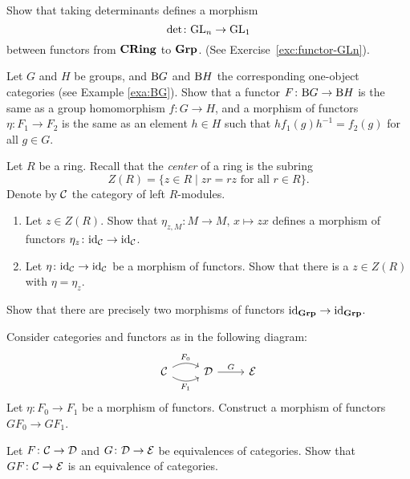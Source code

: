 \begin{exercise}
Show that taking determinants defines a morphism 
\[
	\det\colon\!\operatorname{GL}_n \to \operatorname{GL}_1
\]
between functors from $\mathbf{CRing}$ to $\mathbf{Grp}$. (See Exercise~\ref{exc:functor-GLn}).
\end{exercise}


\begin{exercise}
Let $G$ and $H$ be groups, and ${\mathrm B} G$ and ${\mathrm B} H$ the corresponding one-object categories (see Example \ref{exa:BG}). Show that a functor $F\colon {\mathrm B} G \to {\mathrm B} H$ is the same as a group homomorphism $f\colon G\to H$, and a morphism of functors $\eta\colon F_1 \to F_2$ is the same as an element $h\in H$ such that $h f_1(g) h^{-1} = f_2(g)$ for all $g\in G$.
\end{exercise}


\begin{exercise}
Let $R$ be a ring. Recall that the \emph{center} of a ring is the subring
\[
	Z(R) = \{ z \in R \mid zr=rz \text{ for all $r \in R$} \}.
\]
Denote by ${\mathcal{C}}$ the category of left $R$-modules.
\begin{enumerate}
\item Let $z\in Z(R)$. Show that $\eta_{z,M} \colon M \to M,\, x \mapsto zx$ defines a morphism of functors $\eta_z\colon {\rm id}_{\mathcal{C}} \to {\rm id}_{\mathcal{C}}$.
\item Let $\eta \colon {\rm id}_{\mathcal{C}} \to {\rm id}_{\mathcal{C}}$ be a morphism of functors. Show that there is a $z\in Z(R)$ with $\eta = \eta_z$.
\end{enumerate}
\end{exercise}

\begin{exercise}
Show that there are precisely two morphisms of functors ${\rm id}_{\mathbf{Grp}} \to {\rm id}_{\mathbf{Grp}}$.  
\end{exercise}

\begin{exercise}
Consider categories and functors as in the following diagram:
\[
\begin{tikzcd}
\cC \arrow[bend left]{r}{F_0} \arrow[bend right,swap]{r}{F_1} & \cD \arrow{r}{G} & \cE
\end{tikzcd}
\]
Let $\eta\colon F_0 \to F_1$ be a morphism of functors. Construct a morphism of functors $GF_0 \to GF_1$.
\end{exercise}

\begin{exercise}
Let $F\colon {\mathcal{C}} \to {\mathcal{D}}$ and $G\colon {\mathcal{D}}\to {\mathcal{E}}$ be equivalences of categories. Show that $GF\colon {\mathcal{C}} \to {\mathcal{E}}$ is an equivalence of categories.\end{exercise}

